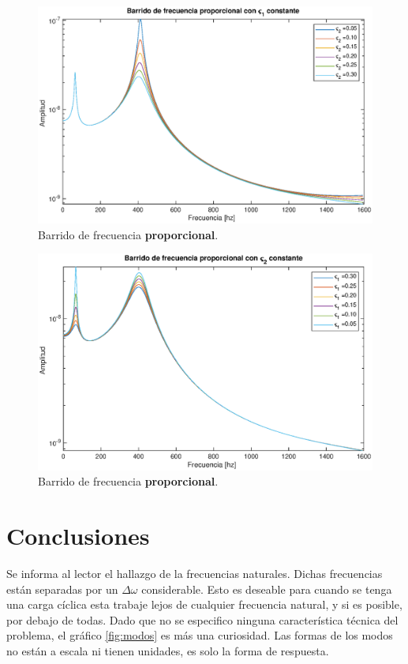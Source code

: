\documentclass[onecolumn,10pt,titlepage,a4paper]{article}
\begin{document}
\begin{figure}[htb!]
	\centering
	\includegraphics[width=1\textwidth]{fig/sinesweepprop1const.eps}
	\caption{Barrido de frecuencia \textbf{proporcional}.}
	\label{fig:sinesweepprop1}
\end{figure}

\begin{figure}[htb!]
	\centering
	\includegraphics[width=1\textwidth]{fig/sinesweepprop2const.eps}
	\caption{Barrido de frecuencia \textbf{proporcional}.}
	\label{fig:sinesweepprop2}
\end{figure}





\clearpage
\section{Conclusiones}
Se informa al lector el hallazgo de la frecuencias naturales. Dichas frecuencias están separadas por un $\Delta \omega $ considerable. Esto es deseable para cuando se tenga una carga cíclica esta trabaje lejos de cualquier frecuencia natural, y si es posible, por debajo de todas. Dado que no se especifico ninguna característica técnica del problema, el gráfico \ref{fig:modos} es más una curiosidad. Las formas de los modos no están a escala ni tienen unidades, es solo la forma de respuesta. 
\end{document}
